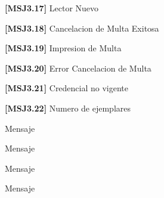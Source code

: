	\begin{Citemize}
	\item {\bf [MSJ3.17]} Lector Nuevo
	\end{Citemize}
	
	\begin{Citemize}
	\item {\bf [MSJ3.18]} Cancelacion de Multa Exitosa
	\end{Citemize}

	\begin{Citemize}
	\item {\bf [MSJ3.19]} Impresion de Multa
	\end{Citemize}
	
	\begin{Citemize}
	\item {\bf [MSJ3.20]} Error Cancelacion de Multa
	\end{Citemize}
	
	\begin{Citemize}
	\item {\bf [MSJ3.21]} Credencial no vigente
	\end{Citemize}
	
	\begin{Citemize}
	\item {\bf [MSJ3.22]} Numero de ejemplares
	\end{Citemize}
\begin{Citemize}
	\item Mensaje 
\end{Citemize}

\begin{Citemize}	
	\item Mensaje 
\end{Citemize}

\begin{Citemize}	
	\item Mensaje 
\end{Citemize}

\begin{Citemize}	
	\item Mensaje 
\end{Citemize}

